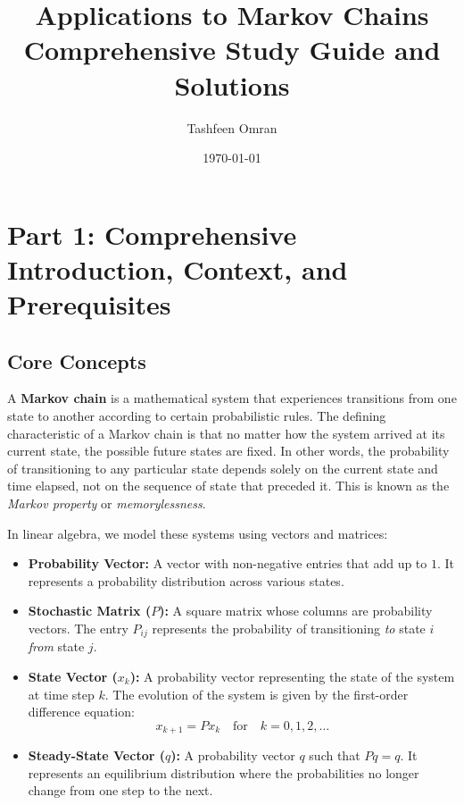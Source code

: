 \documentclass[11pt, letterpaper]{article}
\theoremstyle{definition}
\theoremstyle{remark}
\begin{document}
\title{\textbf{Applications to Markov Chains}\\ \Large Comprehensive Study Guide and Solutions}
\author{Tashfeen Omran}
\date{\today}
\maketitle

\tableofcontents
\newpage

\section{Part 1: Comprehensive Introduction, Context, and Prerequisites}

\subsection{Core Concepts}
A \textbf{Markov chain} is a mathematical system that experiences transitions from one state to another according to certain probabilistic rules. The defining characteristic of a Markov chain is that no matter how the system arrived at its current state, the possible future states are fixed. In other words, the probability of transitioning to any particular state depends solely on the current state and time elapsed, not on the sequence of state that preceded it. This is known as the \textit{Markov property} or \textit{memorylessness}.

In linear algebra, we model these systems using vectors and matrices:
\begin{itemize}
    \item \textbf{Probability Vector:} A vector with non-negative entries that add up to $1$. It represents a probability distribution across various states.
    \item \textbf{Stochastic Matrix ($P$):} A square matrix whose columns are probability vectors. The entry $P_{ij}$ represents the probability of transitioning \textit{to} state $i$ \textit{from} state $j$.
    \item \textbf{State Vector ($x_k$):} A probability vector representing the state of the system at time step $k$. The evolution of the system is given by the first-order difference equation:
    \[ x_{k+1} = P x_k \quad \text{for} \quad k = 0, 1, 2, \dots \]
    \item \textbf{Steady-State Vector ($q$):} A probability vector $q$ such that $Pq = q$. It represents an equilibrium distribution where the probabilities no longer change from one step to the next.
\end{itemize}
\end{document}
